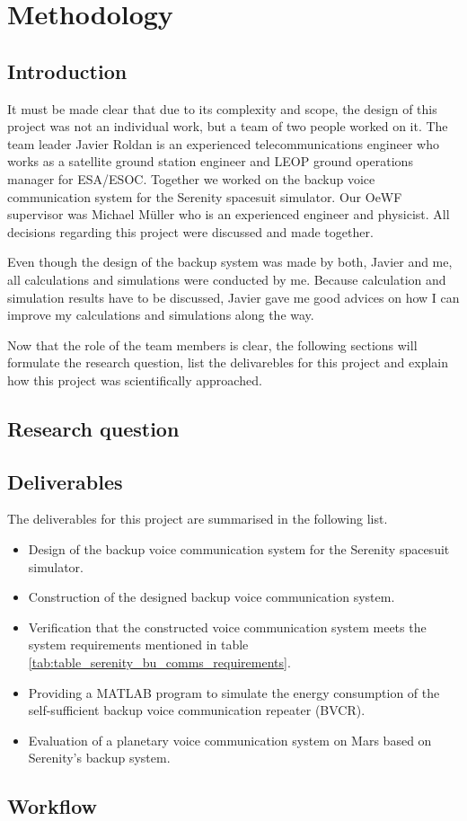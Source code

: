 \chapter{Methodology}

\section{Introduction}
It must be made clear that due to its complexity and scope, the design of this project was not an individual work, but a team of two people worked on it. The team leader Javier Roldan is an experienced telecommunications engineer who works as a satellite ground station engineer and LEOP ground operations manager for ESA/ESOC. Together we worked on the backup voice communication system for the Serenity spacesuit simulator. Our OeWF supervisor was Michael Müller who is an experienced engineer and physicist. All decisions regarding this project were discussed and made together.

Even though the design of the backup system was made by both, Javier and me, all calculations and simulations were conducted by me. Because calculation and simulation results have to be discussed, Javier gave me good advices on how I can improve my calculations and simulations along the way.

Now that the role of the team members is clear, the following sections will formulate the research question, list the delivarebles for this project and explain how this project was scientifically approached.

\section{Research question}


\section{Deliverables}
The deliverables for this project are summarised in the following list.

\begin{itemize}
	\item Design of the backup voice communication system for the Serenity spacesuit simulator.
	\item Construction of the designed backup voice communication system.
	\item Verification that the constructed voice communication system meets the system requirements mentioned in table \ref{tab:table_serenity_bu_comms_requirements}.
	\item Providing a MATLAB program to simulate the energy consumption of the self-sufficient backup voice communication repeater (BVCR).
	\item Evaluation of a planetary voice communication system on Mars based on Serenity's backup system.
\end{itemize}

\section{Workflow}
